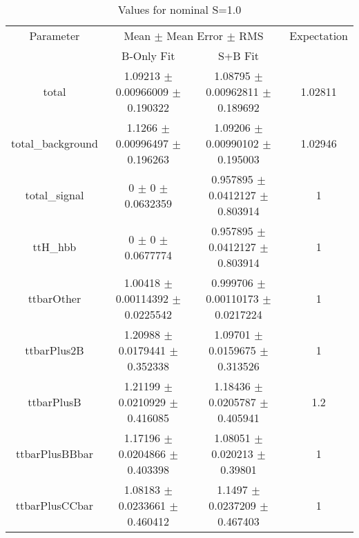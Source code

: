\begin{table}
\centering
\caption{Values for nominal S=1.0}
\begin{tabular}{cccc}
\toprule
Parameter & \multicolumn{2}{c}{Mean $\pm$ Mean Error $\pm$ RMS} & Expectation\\
 & B-Only Fit & S+B Fit & \\
\midrule
total & \num{1.09213} $\pm$ \num{0.00966009} $\pm$ \num{0.190322} & \num{1.08795} $\pm$ \num{0.00962811} $\pm$ \num{0.189692} & \num{1.02811}\\
total\_background & \num{1.1266} $\pm$ \num{0.00996497} $\pm$ \num{0.196263} & \num{1.09206} $\pm$ \num{0.00990102} $\pm$ \num{0.195003} & \num{1.02946}\\
total\_signal & \num{0} $\pm$ \num{0} $\pm$ \num{0.0632359} & \num{0.957895} $\pm$ \num{0.0412127} $\pm$ \num{0.803914} & \num{1}\\
ttH\_hbb & \num{0} $\pm$ \num{0} $\pm$ \num{0.0677774} & \num{0.957895} $\pm$ \num{0.0412127} $\pm$ \num{0.803914} & \num{1}\\
ttbarOther & \num{1.00418} $\pm$ \num{0.00114392} $\pm$ \num{0.0225542} & \num{0.999706} $\pm$ \num{0.00110173} $\pm$ \num{0.0217224} & \num{1}\\
ttbarPlus2B & \num{1.20988} $\pm$ \num{0.0179441} $\pm$ \num{0.352338} & \num{1.09701} $\pm$ \num{0.0159675} $\pm$ \num{0.313526} & \num{1}\\
ttbarPlusB & \num{1.21199} $\pm$ \num{0.0210929} $\pm$ \num{0.416085} & \num{1.18436} $\pm$ \num{0.0205787} $\pm$ \num{0.405941} & \num{1.2}\\
ttbarPlusBBbar & \num{1.17196} $\pm$ \num{0.0204866} $\pm$ \num{0.403398} & \num{1.08051} $\pm$ \num{0.020213} $\pm$ \num{0.39801} & \num{1}\\
ttbarPlusCCbar & \num{1.08183} $\pm$ \num{0.0233661} $\pm$ \num{0.460412} & \num{1.1497} $\pm$ \num{0.0237209} $\pm$ \num{0.467403} & \num{1}\\
\bottomrule
\end{tabular}
\end{table}